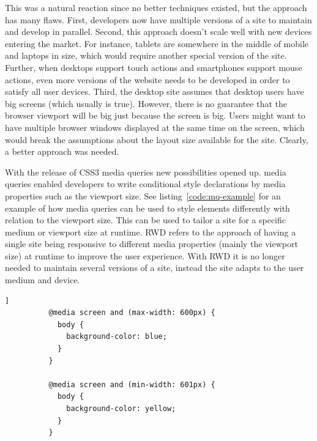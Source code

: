 \documentclass[a4paper,11pt]{kth-mag}
\begin{document}
        This was a natural reaction since no better techniques existed, but the approach has many flaws.
        First, developers now have multiple versions of a site to maintain and develop in parallel.
        Second, this approach doesn't scale well with new devices entering the market.
        For instance, tablets are somewhere in the middle of mobile and laptops in size, which would require another special version of the site.
        Further, when desktops support touch actions and smartphones support mouse actions, even more versions of the website needs to be developed in order to satisfy all user devices.
        Third, the desktop site assumes that desktop users have big screens (which usually is true).
        However, there is no guarantee that the \gls{browser} \gls{viewport} will be big just because the screen is big.
        Users might want to have multiple \gls{browser} windows displayed at the same time on the screen, which would break the assumptions about the layout size available for the site.
        Clearly, a better approach was needed.

        With the release of \gls{CSS3} \gls{media queries} new possibilities opened up.
        \Gls{media queries} enabled developers to write conditional style declarations by media properties such as the \gls{viewport} size.
        See listing~\ref{code:mq-example} for an example of how \gls{media queries} can be used to style \glspl{element} differently with relation to the \gls{viewport} size.
        This can be used to tailor a site for a specific medium or \gls{viewport} size at runtime.
        \gls{RWD} refers to the approach of having a single site being \gls{responsive} to different media properties (mainly the \gls{viewport} size) at runtime to improve the user experience.
        With \gls{RWD} it is no longer needed to maintain several versions of a site, instead the site adapts to the user medium and device.

        \begin{lstlisting}[gobble=10,label={code:mq-example},caption={The above \gls{CSS} styles the body of the website blue if the \gls{viewport} is less or equal to 600 pixels wide, and yellow otherwise.},captionpos=b]]
          @media screen and (max-width: 600px) {
            body {
              background-color: blue;
            }
          }

          @media screen and (min-width: 601px) {
            body {
              background-color: yellow;
            }
          }
        \end{lstlisting}
\end{document}
